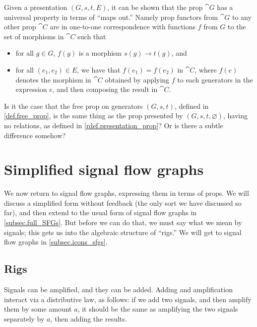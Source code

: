\documentclass[7Sketches]{subfiles}
\begin{document}
\begin{remark}%
\label{rem.free_prop_universal_property}%
Given a presentation $(G,s,t,E)$, it can be shown that the prop $\cat{G}$ has a
universal property in terms of ``maps out.'' Namely prop functors from $\cat{G}$
to any other prop $\cat{C}$ are in one-to-one correspondence with functions $f$
from $G$ to the set of morphisms in $\cat{C}$ such that 
\begin{itemize}
\item for all $g \in G$, $f(g)$ is a morphism $s(g) \to t(g)$, and 
\item for all $(e_1,e_2) \in E$, we have that $f(e_1)=f(e_2)$ in
$\cat{C}$, where $f(e)$ denotes the morphism in $\cat{C}$ obtained by
applying $f$ to each generators in the expression $e$, and then composing
the result in $\cat{C}$. 
\end{itemize}
\end{remark}

\begin{exercise}%
\label{exc.same_free_prop}
Is it the case that the free prop on generators $(G,s,t)$, defined in \cref{def.free_prop}, is the same thing as the prop presented by $(G,s,t,\varnothing)$, having no relations, as defined in \cref{rdef.presentation_prop}? Or is there a subtle difference somehow?
\end{exercise}

%


\section{Simplified signal flow graphs}

We now return to signal flow graphs, expressing them in terms of props. We will
discuss a simplified form without feedback (the only sort we have discussed so
far), and then extend to the usual form of signal flow graphs in
\cref{subsec.full_SFGs}. But before we can do that, we must say what we mean by
signals; this gets us into the algebraic structure of ``rigs.'' We will get to
signal flow graphs in \cref{subsec.icons_sfgs}.

\subsection{Rigs}%
Signals can be amplified, and they can be added. Adding and amplification
interact via a distributive law, as follows: if we add two signals, and then amplify them by some amount $a$, it should be the same as amplifying the two signals
separately by $a$, then adding the results. 
\end{document}
